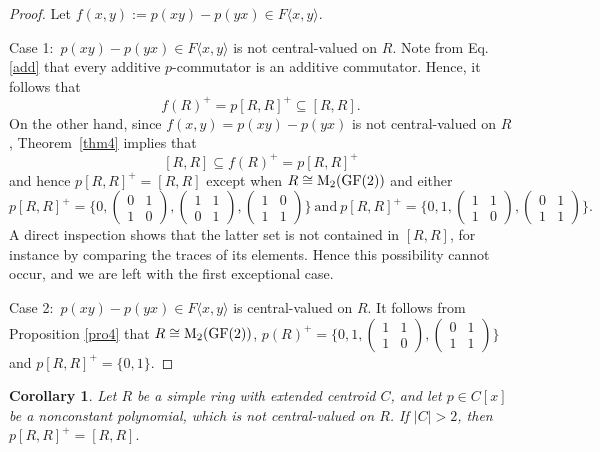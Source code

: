 \documentclass[11pt]{article}
\newtheorem{corollary}[theorem]{Corollary}
\theoremstyle{definition}
\begin{document}
{{{{				\begin{proof}
Let $f(x,y):=p(xy)-p(yx)\in F\langle x, y\rangle$.

Case 1:\ $p(xy)-p(yx)\in F\langle x, y \rangle$ is not central-valued on $R$. Note from Eq.\eqref{add} that every additive $p$-commutator is an additive commutator. Hence, it follows that $$f(R)^+=p[R, R]^+\subseteq [R,R].$$ On the other hand, since $f(x,y)=p(xy)-p(yx)$ is not central-valued on $R$, Theorem~\ref{thm4} implies that $$[R,R]\subseteq f(R)^+=p[R, R]^+$$ and hence
					$p[R, R]^+=[R,R]$
					except when $R\cong {\rm M}_2({\rm GF}(2))$ and either
$$
p[R, R]^+=\{0, \begin{pmatrix}
						0 & 1 \\
						1 & 0
					\end{pmatrix}, \begin{pmatrix}
						1& 1 \\
						0 & 1
					\end{pmatrix},  \begin{pmatrix}
						1& 0 \\
						1 & 1
					\end{pmatrix}\}\ \text{and}\
p[R, R]^+=\{0, 1, \begin{pmatrix}
						1 & 1 \\
						1 & 0
					\end{pmatrix}, \begin{pmatrix}
						0 & 1 \\
						1 & 1
					\end{pmatrix}\}.
$$
A direct inspection shows that the latter set is not contained in $[R,R]$, for instance by comparing the traces of its elements. Hence this possibility cannot occur, and we are left with the first exceptional case.

Case 2:\ $p(xy)-p(yx)\in F\langle x, y \rangle$ is central-valued on $R$. It follows from Proposition \ref{pro4} that $R\cong {\rm M}_2({\rm GF}(2))$,
$p(R)^+=\{0, 1, \begin{pmatrix}
						1 & 1 \\
						1 & 0
					\end{pmatrix}, \begin{pmatrix}
						0 & 1 \\
						1 & 1
					\end{pmatrix}\}$ and $p[R, R]^+=\{0, 1\}$.
\end{proof}

\begin{corollary}\label{cor25}
Let $R$ be a simple ring with extended centroid $C$, and let $p \in C[x]$ be a nonconstant polynomial, which is not central-valued on $R$.
If $|C|>2$, then $p[R, R]^+=[R,R].$
\end{corollary}
				
}}}}
\end{document}
